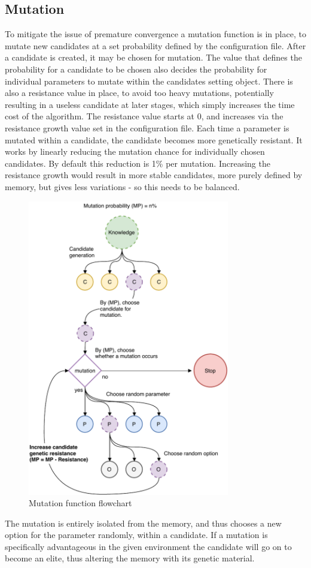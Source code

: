 \documentclass[a4paper,english]{report}
\begin{document}
		\subsection{Mutation}
		To mitigate the issue of premature convergence a mutation function is in place, to mutate new candidates at a set probability defined by the configuration file. After a candidate is created, it may be chosen for mutation. The value that defines the probability for a candidate to be chosen also decides the probability for individual parameters to mutate within the candidates setting object. There is also a resistance value in place, to avoid too heavy mutations, potentially resulting in a useless candidate at later stages, which simply increases the time cost of the algorithm. The resistance value starts at 0, and increases via the resistance growth value set in the configuration file. Each time a parameter is mutated within a candidate, the candidate becomes more genetically resistant. It works by linearly reducing the mutation chance for individually chosen candidates. By default this reduction is 1\% per mutation. Increasing the resistance growth would result in more stable candidates, more purely defined by memory, but gives less variations - so this needs to be balanced. 
		\begin{figure}[H]
			\centering
			\includegraphics[width=250pt]{Mutation}
			\caption{Mutation function flowchart}
			\label{fig:mutation}
		\end{figure}
		The mutation is entirely isolated from the memory, and thus chooses a new option for the parameter randomly, within a candidate. If a mutation is specifically advantageous in the given environment the candidate will go on to become an elite, thus altering the memory with its genetic material.
\end{document}

